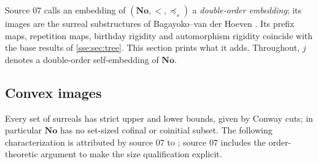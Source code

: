 \documentclass[11pt,a4paper]{article}
\numberwithin{equation}{section}
\theoremstyle{plain}
\theoremstyle{definition}
\theoremstyle{remark}
\newcommand{\No}{\mathbf{No}}
\newcommand{\pref}{\preccurlyeq_s}
\begin{document}
Source 07 calls an embedding of $(\No,<,\pref)$ a \emph{double-order
embedding}; its images are the surreal substructures of
Bagayoko--van der Hoeven \cite{BVH}. Its prefix maps, repetition maps,
birthday rigidity and automorphism rigidity coincide with the base results
of \cref{sse:sec:tree}. This section prints what it adds. Throughout, $j$
denotes a double-order self-embedding of $\No$.

\subsection{Convex images}
Every set of surreals has strict upper and lower bounds, given by Conway
cuts; in particular $\No$ has no set-sized cofinal or coinitial subset.
The following characterization is attributed by source 07 to
\cite[Proposition~4.18]{BVH}; source 07 includes the order-theoretic
argument to make the size qualification explicit.
\end{document}
